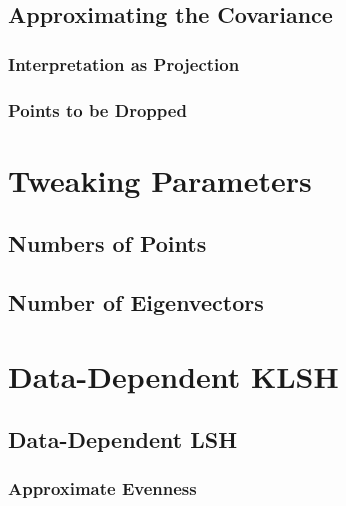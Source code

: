 \documentclass[twoside,11pt]{homework}
\begin{document}
\begin{multicols}{2}

\subsection{Approximating the Covariance} %

\subsubsection{Interpretation as Projection} %

\subsubsection{Points to be Dropped} %

\section{Tweaking Parameters} %

\subsection{Numbers of Points}

\subsection{Number of Eigenvectors}

\section{Data-Dependent KLSH} %

\subsection{Data-Dependent LSH}

\subsubsection{Approximate Evenness}


\end{multicols}
\end{document}
